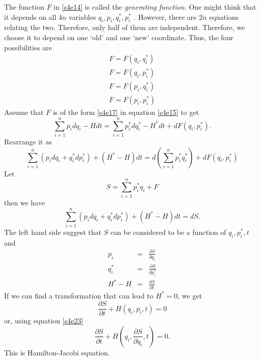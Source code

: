 \documentclass{article}
\newcommand{\pd}[2]{\frac{\partial{#1}}{\partial{#2}}}
\numberwithin{equation}{section}
\theoremstyle{plain}
\numberwithin{thm}{section}
\theoremstyle{plain}
\numberwithin{prop}{section}
\theoremstyle{definition}
\numberwithin{defn}{section}
\theoremstyle{remark}
\begin{document}
The function $F$ in \eqref{s4e14} is called the \emph{generating function}. One
might think that it depends on all $4n$ variables $q_i, p_i, q_i^\ast, p_i^\ast$
. However, there are $2n$ equations relating the two. Therefore, only half of
them are independent. Therefore, we choose it to depend on one `old' and one 
`new' coordinate. Thus, the four possibilities are
\begin{eqnarray}
F = F(q_i, q_i^\ast) \label{s4e16} \\
F = F(q_i, p_i^\ast) \label{s4e17} \\
F = F(p_i, q_i^\ast) \label{s4e18} \\
F = F(p_i, p_i^\ast) \label{s4e19} 
\end{eqnarray}
Assume that $F$ is of the form \eqref{s4e17} in equation \eqref{s4e15} to get
\begin{equation}\label{s4e20}
\sum_{i=1}^np_idq_i - Hdt = \sum_{i=1}^np^\ast_idq^\ast_i - H^\ast dt + 
dF(q_i, p_i^\ast).
\end{equation}
Rearrange it as
\[
\sum_{i=1}^n(p_idq_i + q_i^\ast dp^\ast_i) + (H^\ast - H)dt = 
d\left(\sum_{i=1}^n p_i^\ast q_i^\ast\right) + dF(q_i, p_i^\ast)
\]
Let
\begin{equation}\label{s4e21}
S = \sum_{i=1}^n p_i^\ast q_i + F
\end{equation}
then we have
\begin{equation}\label{s4e22}
\sum_{i=1}^n(p_idq_i + q_i^\ast dp^\ast_i) + (H^\ast - H)dt = dS.
\end{equation}
The left hand side suggest that $S$ can be considered to be a function of
$q_i, p_i^\ast, t$ and
\begin{eqnarray}
p_i &=& \pd{S}{q_i} \label{s4e23} \\
q_i^\ast &=& \pd{S}{p_i^\ast} \label{s4e24} \\
H^\ast - H &=& \pd{S}{t} \label{s4e25}
\end{eqnarray}
If we can find a transformation that can lead to $H^\ast = 0$, we get
\begin{equation}\label{s4e26}
\pd{S}{t} + H\left(q_i, p_i, t\right) = 0
\end{equation}
or, using equation \eqref{s4e23}
\begin{equation}\label{s4e27}
\pd{S}{t} + H\left(q_i, \pd{S}{q_i}, t\right) = 0.
\end{equation}
This is Hamilton-Jacobi equation.
\end{document}
